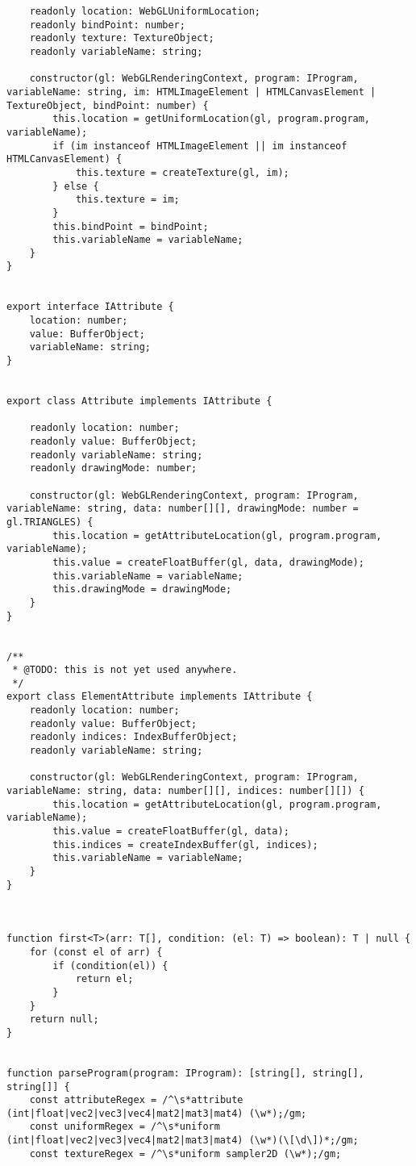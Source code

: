 \begin{lstlisting}
    readonly location: WebGLUniformLocation;
    readonly bindPoint: number;
    readonly texture: TextureObject;
    readonly variableName: string;

    constructor(gl: WebGLRenderingContext, program: IProgram, variableName: string, im: HTMLImageElement | HTMLCanvasElement | TextureObject, bindPoint: number) {
        this.location = getUniformLocation(gl, program.program, variableName);
        if (im instanceof HTMLImageElement || im instanceof  HTMLCanvasElement) {
            this.texture = createTexture(gl, im);
        } else {
            this.texture = im;
        }
        this.bindPoint = bindPoint;
        this.variableName = variableName;
    }
}


export interface IAttribute {
    location: number;
    value: BufferObject;
    variableName: string;
}


export class Attribute implements IAttribute {

    readonly location: number;
    readonly value: BufferObject;
    readonly variableName: string;
    readonly drawingMode: number;

    constructor(gl: WebGLRenderingContext, program: IProgram, variableName: string, data: number[][], drawingMode: number = gl.TRIANGLES) {
        this.location = getAttributeLocation(gl, program.program, variableName);
        this.value = createFloatBuffer(gl, data, drawingMode);
        this.variableName = variableName;
        this.drawingMode = drawingMode;
    }
}


/**
 * @TODO: this is not yet used anywhere.
 */
export class ElementAttribute implements IAttribute {
    readonly location: number;
    readonly value: BufferObject;
    readonly indices: IndexBufferObject;
    readonly variableName: string;

    constructor(gl: WebGLRenderingContext, program: IProgram, variableName: string, data: number[][], indices: number[][]) {
        this.location = getAttributeLocation(gl, program.program, variableName);
        this.value = createFloatBuffer(gl, data);
        this.indices = createIndexBuffer(gl, indices);
        this.variableName = variableName;
    }
}



function first<T>(arr: T[], condition: (el: T) => boolean): T | null {
    for (const el of arr) {
        if (condition(el)) {
            return el;
        }
    }
    return null;
}


function parseProgram(program: IProgram): [string[], string[], string[]] {
    const attributeRegex = /^\s*attribute (int|float|vec2|vec3|vec4|mat2|mat3|mat4) (\w*);/gm;
    const uniformRegex = /^\s*uniform (int|float|vec2|vec3|vec4|mat2|mat3|mat4) (\w*)(\[\d\])*;/gm;
    const textureRegex = /^\s*uniform sampler2D (\w*);/gm;


\end{lstlisting}
